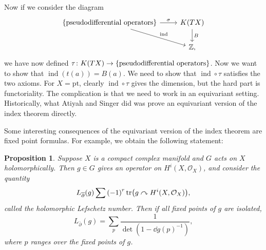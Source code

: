 \documentclass[leqno, openany]{memoir}
\newtheorem{prop}[thm]{Proposition}
\theoremstyle{definition}
\theoremstyle{remark}
\theoremstyle{plain}
\theoremstyle{definition}
\theoremstyle{remark}
\newcommand{\Z}{\mathbb{Z}}
\newcommand{\mc}[1]{\mathcal{#1}}
\newcommand{\mr}[1]{\mathrm{#1}}
\newcommand{\ol}[1]{\overline{#1}}
\DeclareMathOperator{\ind}{ind}
\begin{document}
Now if we consider the diagram \begin{equation*} \begin{tikzcd}
\qty{\text{pseudodifferential operators}} \ar{r}{\sigma} \ar{dr}{\ind} & K(TX)
\ar{d}{B} \\ & \Z, \end{tikzcd} \end{equation*} we have now defined $\tau
\colon K(TX) \to \qty{\text{pseudodifferential operators}}$. Now we want to
show that $\ind(t(a)) = B(a)$. We need to show that $\ind \circ \tau$ satisfies
the two axioms. For $X = \mr{pt}$, clearly $\ind \circ \tau$ gives the
dimension, but the hard part is functoriality. The complication is that we need
to work in an equivariant setting. Historically, what Atiyah and Singer did was
prove an equivariant version of the index theorem directly.

Some interesting consequences of the equivariant version of the index theorem
are fixed point formulas. For example, we obtain the following statement:
\begin{prop} Suppose $X$ is a compact complex manifold and $G$ acts on $X$
    holomorphically. Then $g \in G$ gives an operator on $H^i(X, \mc{O}_X)$,
    and consider the quantity \[ L_{\ol{\partial}}(g) \sum {(-1)}^r \tr(g
        \curvearrowright H^i(X, \mc{O}_X)), \] called the \textit{holomorphic
        Lefschetz number}. Then if all fixed points of $g$ are isolated, \[
        L_{\ol{\partial}}(g) = \sum_p \frac{1}{\det(1-{\dd{g}(p)}^{-1})}, \]
    where $p$ ranges over the fixed points of $g$.  \end{prop}
\end{document}
